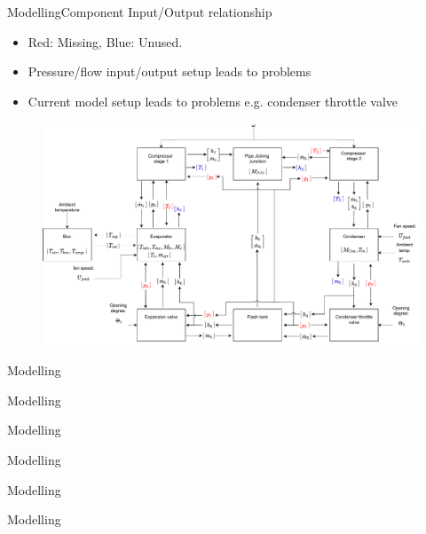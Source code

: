 
\begin{frame}{Modelling}{Component Input/Output relationship}
	\begin{itemize}
		\item Red: Missing, Blue: Unused.
		\item Pressure/flow input/output setup leads to problems
		\item Current model setup leads to problems e.g. condenser throttle valve
	\end{itemize}
	\begin{figure}[h!]
		\centering
		\includegraphics[width=1\textwidth]{../Graphics/Block_Diagram_inout_flowValveVersion.pdf}
		\label{fig:Block_diagram_inout}
	\end{figure}
	
\end{frame}





\begin{frame}{Modelling}{}
	
\end{frame}




\begin{frame}{Modelling}{}
	
\end{frame}




\begin{frame}{Modelling}{}
	
\end{frame}




\begin{frame}{Modelling}{}
	
\end{frame}




\begin{frame}{Modelling}{}
	
\end{frame}




\begin{frame}{Modelling}{}
	
\end{frame}





